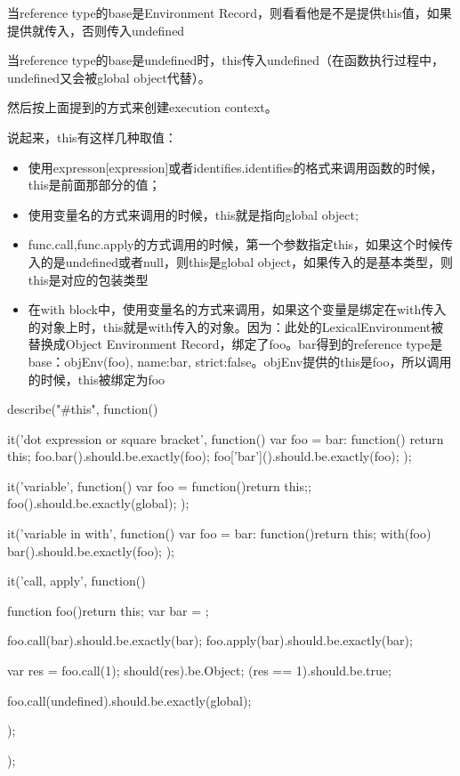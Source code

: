 当reference type的base是Environment Record，则看看他是不是提供this值，如果提供就传入，否则传入undefined

当reference type的base是undefined时，this传入undefined（在函数执行过程中，undefined又会被global object代替）。

然后按上面提到的方式来创建execution context。

说起来，this有这样几种取值：
\begin{itemize}
\item 使用expresson[expression]或者identifies.identifies的格式来调用函数的时候，this是前面那部分的值；
\item 使用变量名的方式来调用的时候，this就是指向global object;
\item func.call,func.apply的方式调用的时候，第一个参数指定this，如果这个时候传入的是undefined或者null，则this是global object，如果传入的是基本类型，则this是对应的包装类型
\item 在with block中，使用变量名的方式来调用，如果这个变量是绑定在with传入的对象上时，this就是with传入的对象。因为：此处的LexicalEnvironment被替换成Object Environment Record，绑定了foo。bar得到的reference type是{base：objEnv(foo), name:bar, strict:false}。objEnv提供的this是foo，所以调用的时候，this被绑定为foo
\end{itemize}

\begin{JavaScript}
	describe("#this", function(){
		it('dot expression or square bracket', function(){
			var foo = {
				bar: function(){ return this;}
			}
			foo.bar().should.be.exactly(foo);
			foo['bar']().should.be.exactly(foo);
		});

		it('variable', function(){
			var foo = function(){return this;};
			foo().should.be.exactly(global);
		});

		it('variable in with', function(){
			var foo = {
				bar: function(){return this;}
			}
			with(foo){
				bar().should.be.exactly(foo);
			}
		});

		it('call, apply', function(){
			function foo(){return this;}
			var bar = {};
			
			foo.call(bar).should.be.exactly(bar);
			foo.apply(bar).should.be.exactly(bar);

			var res = foo.call(1);
			should(res).be.Object;
			(res == 1).should.be.true;

			foo.call(undefined).should.be.exactly(global);
		});
	});
\end{JavaScript}


